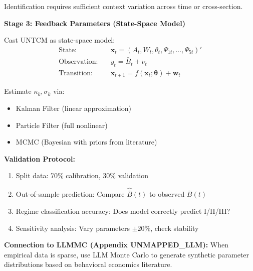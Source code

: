 \begin{tcolorbox}[colback=green!5!white, colframe=green!75!black,
    title=\textbf{Method UNTCM-M2: Parameter Calibration Protocol}]
Identification requires sufficient context variation across time or cross-section.

\textbf{Stage 3: Feedback Parameters (State-Space Model)}

Cast UNTCM as state-space model:
\begin{align}
\text{State:} \quad & \mathbf{x}_t = (A_t, W_t, \theta_t, \Psi_{1t}, ..., \Psi_{5t})' \\
\text{Observation:} \quad & y_t = \bar{B}_t + \nu_t \\
\text{Transition:} \quad & \mathbf{x}_{t+1} = f(\mathbf{x}_t; \boldsymbol{\theta}) + \mathbf{w}_t
\end{align}

Estimate $\kappa_k, \sigma_k$ via:
\begin{itemize}[nosep]
\item Kalman Filter (linear approximation)
\item Particle Filter (full nonlinear)
\item MCMC (Bayesian with priors from literature)
\end{itemize}

\textbf{Validation Protocol:}
\begin{enumerate}[nosep]
\item Split data: 70\% calibration, 30\% validation
\item Out-of-sample prediction: Compare $\hat{\bar{B}}(t)$ to observed $\bar{B}(t)$
\item Regime classification accuracy: Does model correctly predict I/II/III?
\item Sensitivity analysis: Vary parameters $\pm 20\%$, check stability
\end{enumerate}

\textbf{Connection to LLMMC (Appendix UNMAPPED_LLM):}
When empirical data is sparse, use LLM Monte Carlo to generate synthetic parameter distributions based on behavioral economics literature.

\end{tcolorbox}

